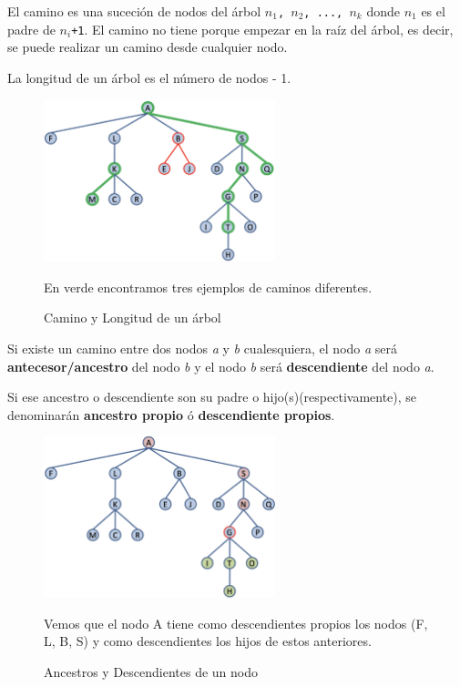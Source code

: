  El camino es una suceción de nodos del árbol \texttt{$n_1$, $n_2$, ..., $n_k$} donde  \texttt{$n_1$} es el padre de  \texttt{$n_i$+1}. El camino no tiene porque empezar en la raíz del árbol, es decir, se puede realizar un camino desde cualquier nodo.

La longitud de un árbol es el número de nodos - 1.

\begin{figure}[h]
  \begin{center}
    \includegraphics[width=0.6\textwidth]{assets/IntroArboles4.png}
  \end{center}
  \caption{Camino y Longitud de un árbol}
  En verde encontramos tres ejemplos de caminos diferentes.
\end{figure}

 Si existe un camino entre dos nodos \textit{a} y \textit{b} cualesquiera, el nodo \textit{a} será \textbf{antecesor/ancestro} del nodo \textit{b} y el nodo \textit{b} será \textbf{descendiente} del nodo \textit{a}.

Si ese ancestro o descendiente son su padre o hijo(s)(respectivamente), se denominarán \textbf{ancestro propio} ó \textbf{descendiente propios}.

\begin{figure}[h]
  \begin{center}
    \includegraphics[width=0.6\textwidth]{assets/IntroArboles5.png}
  \end{center}
  \caption{Ancestros y Descendientes de un nodo}
  Vemos que el nodo A tiene como descendientes propios los nodos (F, L, B, S) y como descendientes los hijos de estos anteriores.
\end{figure}
\newpage
